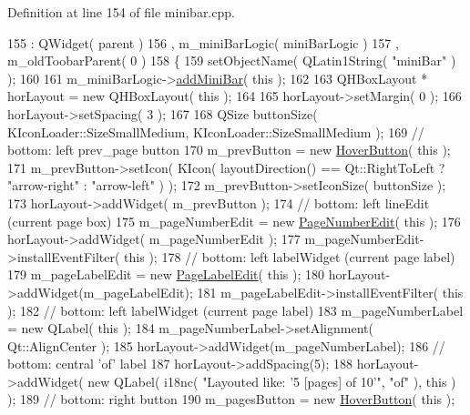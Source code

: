 Definition at line 154 of file minibar.\+cpp.


\begin{DoxyCode}
155     : QWidget( parent )
156     , m\_miniBarLogic( miniBarLogic )
157     , m\_oldToobarParent( 0 )
158 \{
159     setObjectName( QLatin1String( \textcolor{stringliteral}{"miniBar"} ) );
160     
161     m\_miniBarLogic->\hyperlink{classMiniBarLogic_a87a87879be36670674541361566b0ed7}{addMiniBar}( \textcolor{keyword}{this} );
162 
163     QHBoxLayout * horLayout = \textcolor{keyword}{new} QHBoxLayout( \textcolor{keyword}{this} );
164 
165     horLayout->setMargin( 0 );
166     horLayout->setSpacing( 3 );
167 
168     QSize buttonSize( KIconLoader::SizeSmallMedium, KIconLoader::SizeSmallMedium );
169     \textcolor{comment}{// bottom: left prev\_page button}
170     m\_prevButton = \textcolor{keyword}{new} \hyperlink{classHoverButton}{HoverButton}( \textcolor{keyword}{this} );
171     m\_prevButton->setIcon( KIcon( layoutDirection() == Qt::RightToLeft ? \textcolor{stringliteral}{"arrow-right"} : \textcolor{stringliteral}{"arrow-left"} ) );
172     m\_prevButton->setIconSize( buttonSize );
173     horLayout->addWidget( m\_prevButton );
174     \textcolor{comment}{// bottom: left lineEdit (current page box)}
175     m\_pageNumberEdit = \textcolor{keyword}{new} \hyperlink{classPageNumberEdit}{PageNumberEdit}( \textcolor{keyword}{this} );
176     horLayout->addWidget( m\_pageNumberEdit );
177     m\_pageNumberEdit->installEventFilter( \textcolor{keyword}{this} );
178     \textcolor{comment}{// bottom: left labelWidget (current page label)}
179     m\_pageLabelEdit = \textcolor{keyword}{new} \hyperlink{classPageLabelEdit}{PageLabelEdit}( \textcolor{keyword}{this} );
180     horLayout->addWidget(m\_pageLabelEdit);
181     m\_pageLabelEdit->installEventFilter( \textcolor{keyword}{this} );
182     \textcolor{comment}{// bottom: left labelWidget (current page label)}
183     m\_pageNumberLabel = \textcolor{keyword}{new} QLabel( \textcolor{keyword}{this} );
184     m\_pageNumberLabel->setAlignment( Qt::AlignCenter );
185     horLayout->addWidget(m\_pageNumberLabel);
186     \textcolor{comment}{// bottom: central 'of' label}
187     horLayout->addSpacing(5);
188     horLayout->addWidget( \textcolor{keyword}{new} QLabel( i18nc( \textcolor{stringliteral}{"Layouted like: '5 [pages] of 10'"}, \textcolor{stringliteral}{"of"} ), \textcolor{keyword}{this} ) );
189     \textcolor{comment}{// bottom: right button}
190     m\_pagesButton = \textcolor{keyword}{new} \hyperlink{classHoverButton}{HoverButton}( \textcolor{keyword}{this} );

\end{DoxyCode}
